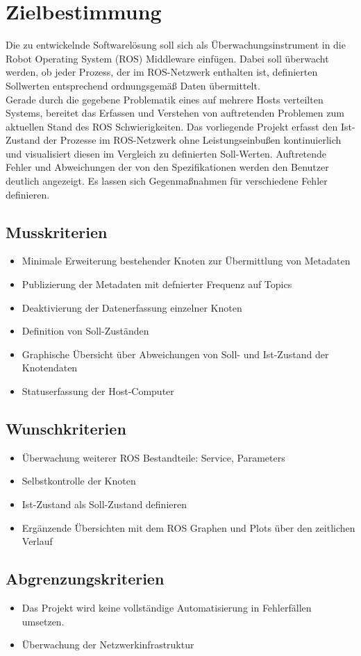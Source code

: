 \chapter{Zielbestimmung}

Die zu entwickelnde Softwarelösung soll sich als Überwachungsinstrument in die Robot Operating System (ROS) Middleware einfügen. Dabei soll überwacht werden, ob jeder Prozess, der im ROS-Netzwerk enthalten ist, definierten Sollwerten entsprechend ordnungsgemäß Daten übermittelt.\\
Gerade durch die gegebene Problematik eines auf mehrere Hosts verteilten Systems, bereitet das Erfassen und Verstehen von auftretenden Problemen zum aktuellen Stand des ROS Schwierigkeiten. Das vorliegende Projekt erfasst den Ist-Zustand der Prozesse im ROS-Netzwerk ohne Leistungseinbußen kontinuierlich und visualisiert diesen im Vergleich zu definierten Soll-Werten. Auftretende Fehler und Abweichungen der von den Spezifikationen werden den Benutzer deutlich angezeigt. Es lassen sich Gegenmaßnahmen für verschiedene Fehler definieren.\\

\section{Musskriterien}
\begin{itemize}
	\item Minimale Erweiterung bestehender Knoten zur Übermittlung von Metadaten
	\item Publizierung der Metadaten mit defnierter Frequenz auf Topics
	\item Deaktivierung der Datenerfassung einzelner Knoten
	\item Definition von Soll-Zuständen
	\item Graphische Übersicht über Abweichungen von Soll- und Ist-Zustand der Knotendaten
	\item Statuserfassung der Host-Computer
\end{itemize}

\section{Wunschkriterien}
\begin{itemize}
	\item Überwachung weiterer ROS Bestandteile: Service, Parameters
	\item Selbstkontrolle der Knoten
	\item Ist-Zustand als Soll-Zustand definieren
	\item Ergänzende Übersichten mit dem ROS Graphen und Plots über den zeitlichen Verlauf
\end{itemize}

\section{Abgrenzungskriterien}
\begin{itemize}
	\item Das Projekt wird keine vollständige Automatisierung in Fehlerfällen umsetzen.
	\item Überwachung der Netzwerkinfrastruktur
\end{itemize}
